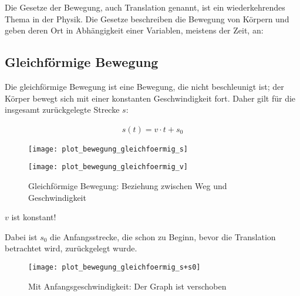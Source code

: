 Die Gesetze der Bewegung, auch Translation genannt, ist ein wiederkehrendes Thema in der Physik. Die Gesetze beschreiben die Bewegung von Körpern und geben deren Ort in Abhängigkeit einer Variablen, meistens der Zeit, an:

\subsection{Gleichförmige Bewegung} \label{subsec:gleichfoermig}

Die gleichförmige Bewegung ist eine Bewegung, die nicht beschleunigt ist; der Körper bewegt sich mit einer konstanten Geschwindigkeit fort. Daher gilt für die insgesamt zurückgelegte Strecke $s$:

\begin{align} \label{eq:gleichfoermig}
	s(t) = v \cdot t + s_0
\end{align}

\begin{figure}[h!]
	\centering
	\begin{minipage}[b]{0.45\linewidth}
		\begin{comment} Gnuplot:
set xlabel "t"
set ylabel "s(t)"
set output "plot_bewegung_gleichfoermig_s.png"
plot s(x) = 1x ls 1
		\end{comment}
    	\texttt{[image: plot\_bewegung\_gleichfoermig\_s]}
	\end{minipage}
	\begin{minipage}[b]{0.45\linewidth}
		\begin{comment} Gnuplot:
set xlabel "t"
set ylabel "v(t)"
set output "plot_bewegung_gleichfoermig_v.png"
plot 1 ls 1
		\end{comment}
    	\texttt{[image: plot\_bewegung\_gleichfoermig\_v]}
	\end{minipage}
	\caption{Gleichförmige Bewegung: Beziehung zwischen Weg und Geschwindigkeit}
\end{figure}


\begin{Wichtig}
$v$ ist konstant!
\end{Wichtig}

\noindent Dabei ist $s_0$ die Anfangsstrecke, die schon zu Beginn, bevor die Translation betrachtet wird, zurückgelegt wurde.

\begin{figure}[h!]
	\centering
	\begin{comment} Gnuplot:
set xlabel "t"
set ylabel "s(t)+s_0"
set output "plot_bewegung_gleichfoermig_s+s0.png"
plot s(x) = 1x+1 ls 1
	\end{comment}
	\texttt{[image: plot\_bewegung\_gleichfoermig\_s+s0]}
	\caption{Mit Anfangsgeschwindigkeit: Der Graph ist verschoben}
\end{figure}

